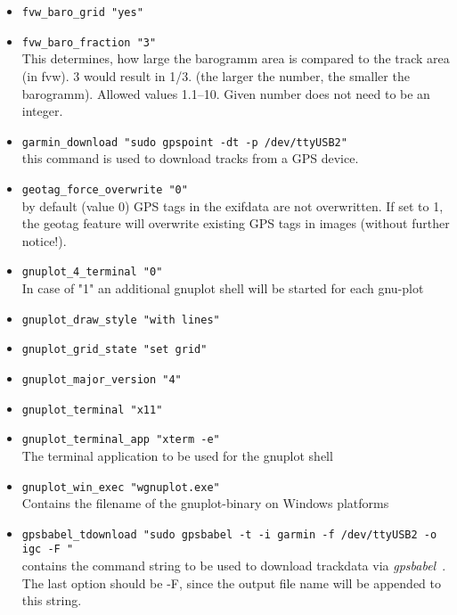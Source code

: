 \begin{itemize}
\item \texttt{fvw\_baro\_grid    "yes"}



\item \texttt{fvw\_baro\_fraction "3"}\\
This determines, how large the barogramm area is compared to the track area (in fvw).
3 would result in 1/3. (the larger the number, the smaller the barogramm). Allowed values 1.1--10.
Given number does not need to be an integer.

\item \texttt{garmin\_download    "sudo gpspoint -dt -p /dev/ttyUSB2"} \\
this command is used to download tracks from a GPS device.

\item \texttt{geotag\_force\_overwrite    "0"} \\
  by default (value 0) GPS tags in the exifdata are not overwritten. If set to 1, the geotag feature will
overwrite existing GPS tags in images (without further notice!).

\item \texttt{gnuplot\_4\_terminal    "0"} \\
 In case of "1" an additional gnuplot shell will be started for each gnu-plot
\item \texttt{gnuplot\_draw\_style    "with lines"}
\item \texttt{gnuplot\_grid\_state    "set grid"}
\item \texttt{gnuplot\_major\_version    "4"}
\item \texttt{gnuplot\_terminal    "x11"}
\item \texttt{gnuplot\_terminal\_app    "xterm -e"}\\
    The terminal application to be used for the gnuplot shell
\item \texttt{gnuplot\_win\_exec    "wgnuplot.exe"}\\
    Contains the filename of the gnuplot-binary on Windows platforms

\item \texttt{gpsbabel\_tdownload  "sudo gpsbabel -t -i garmin -f /dev/ttyUSB2 -o igc -F "}\\
  contains the command string to be used to download trackdata via \emph{gpsbabel}~\cite{gpsbabel}. The last option should be -F, since the output file name will be appended to this string.


\end{itemize}
